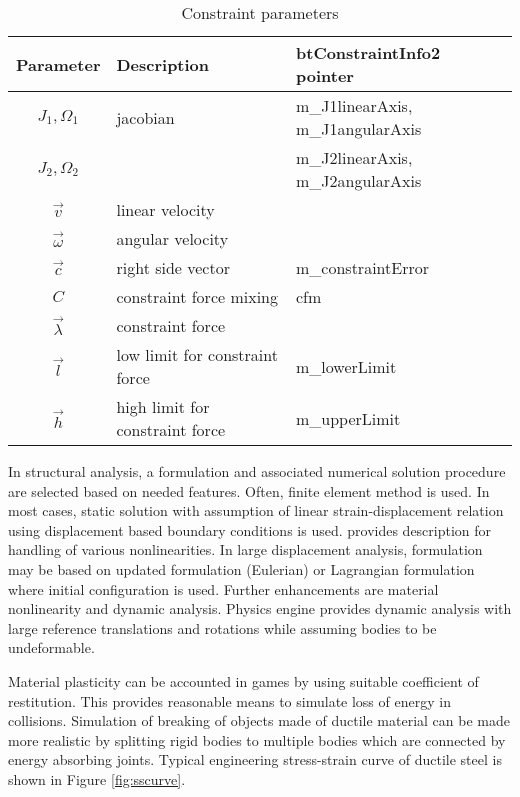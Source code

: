 \begin {table}[htb!]
\begin{center}
\begin{tabular}{|c| l| l|}
\hline
{\bf Parameter} & {\bf Description} & {\bf btConstraintInfo2 pointer}\\  \hline
$J_1, \Omega_1$ & jacobian & m\_J1linearAxis, m\_J1angularAxis \\
$J_2, \Omega_2$ & & m\_J2linearAxis, m\_J2angularAxis \\ \hline
$\vec{v}$ & linear velocity & \\ \hline
$\vec{\omega}$ & angular velocity & \\ \hline
$\vec{c}$        &  right side vector   & m\_constraintError \\ \hline
$C$  & constraint force mixing & cfm \\  \hline
$\vec{\lambda}$ & constraint force &  \\ \hline
$\vec{l}$ & low limit for constraint force & m\_lowerLimit \\ \hline
$\vec{h}$ & high limit for constraint force & m\_upperLimit \\ \hline
\end {tabular}
\end{center}
\caption {Constraint parameters} \label{tab:constraintParameters} 
\end {table}


In structural analysis, a formulation and associated numerical solution procedure are selected 
based on needed features.
Often,  finite element method is used.
In most cases, static solution with assumption of linear strain-displacement relation
using displacement based boundary conditions is used.
\citet{bathe-1975} provides description for handling of various nonlinearities.
In large displacement analysis, formulation may be based on updated formulation (Eulerian) or
Lagrangian formulation where initial configuration is used.
Further enhancements are material nonlinearity and dynamic analysis.
Physics engine provides dynamic analysis with large reference translations and rotations
while assuming bodies to be undeformable.

Material plasticity can be accounted in games by using suitable coefficient of restitution.
This provides reasonable means to simulate loss of energy in collisions.
Simulation of breaking of objects made of ductile material can be made more realistic by splitting rigid bodies
to multiple bodies which are connected by energy absorbing joints.
Typical engineering stress-strain curve of ductile steel is shown in Figure \ref{fig:sscurve}.

